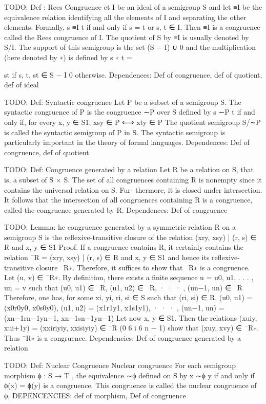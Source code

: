 TODO: Def : Rees Congruence
et I be an ideal of a semigroup S and let ≡I be the equivalence relation
identifying all the elements of I and separating the other elements. Formally,
s ≡I t if and only if s = t or s, t ∈ I. Then ≡I is a congruence called the
Rees congruence of I. The quotient of S by ≡I is usually denoted by S/I. The
support of this semigroup is the set (S − I) ∪ 0 and the multiplication (here
denoted by ∗) is defined by
s ∗ t =
{
st if s, t, st ∈ S − I
0 otherwise.
Dependences: Def of congruence, def of quotient, def of ideal

TODO: Def: Syntactic congruence
Let P be a subset of a semigroup S. The syntactic congruence of P is the
congruence ∼P over S defined by s ∼P t if and only if, for every x, y ∈ S1,
xsy ∈ P ⇐⇒ xty ∈ P
The quotient semigroup S/∼P is called the syntactic semigroup of P in S. The
syntactic semigroup is particularly important in the theory of formal languages.
Dependences: Def of congruence, def of quotient

TODO: Def: Congruence generated by a relation
Let R be a relation on S, that is, a subset of S × S. The set of all congruences
containing R is nonempty since it contains the universal relation on S. Fur-
thermore, it is closed under intersection. It follows that the intersection of all
congruences containing R is a congruence, called the congruence generated by
R. 
Dependences: Def of congruence

TODO: Lemma: he congruence generated by a symmetric relation R on a
semigroup S is the reflexive-transitive closure of the relation
{(xry, xsy) | (r, s) ∈ R and x, y ∈ S1}
Proof. If a congruence contains R, it certainly contains the relation
¯R = {(xry, xsy) | (r, s) ∈ R and x, y ∈ S1}
and hence its reflexive-transitive closure ¯R∗. Therefore, it suffices to show that
¯R∗ is a congruence. Let (u, v) ∈ ¯R∗. By definition, there exists a finite sequence
u = u0, u1, . . . , un = v such that
(u0, u1) ∈ ¯R, (u1, u2) ∈ ¯R, · · · , (un−1, un) ∈ ¯R
Therefore, one has, for some xi, yi, ri, si ∈ S such that (ri, si) ∈ R,
(u0, u1) = (x0r0y0, x0s0y0), (u1, u2) = (x1r1y1, x1s1y1), · · · ,
(un−1, un) = (xn−1rn−1yn−1, xn−1sn−1yn−1)
Let now x, y ∈ S1. Then the relations
(xuiy, xui+1y) = (xxiriyiy, xxisiyiy) ∈ ¯R (0 6 i 6 n − 1)
show that (xuy, xvy) ∈ ¯R∗. Thus ¯R∗ is a congruence.
Dependencies: Def of congruence generated by a relation

TODO: Def: Nuclear Congruence
Nuclear congruence
For each semigroup morphism ϕ : S → T , the equivalence ∼ϕ defined on S by
x ∼ϕ y if and only if ϕ(x) = ϕ(y)
is a congruence. This congruence is called the nuclear congruence of ϕ,
DEPENCENCIES: def of morphism, Def of congruence

}
